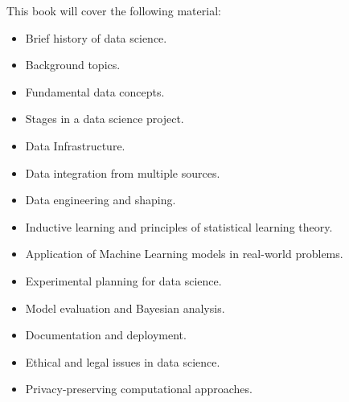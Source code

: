 This book will cover the following material:
\begin{itemize}
  \item Brief history of data science.
  \item Background topics.
  \item Fundamental data concepts.
  \item Stages in a data science project.
  \item Data Infrastructure.
  \item Data integration from multiple sources.
  \item Data engineering and shaping.
  \item Inductive learning and principles of statistical learning theory.
  \item Application of Machine Learning models in real-world problems.
  \item Experimental planning for data science.
  \item Model evaluation and Bayesian analysis.
  \item Documentation and deployment.
  \item Ethical and legal issues in data science.
  \item Privacy-preserving computational approaches.
\end{itemize}
